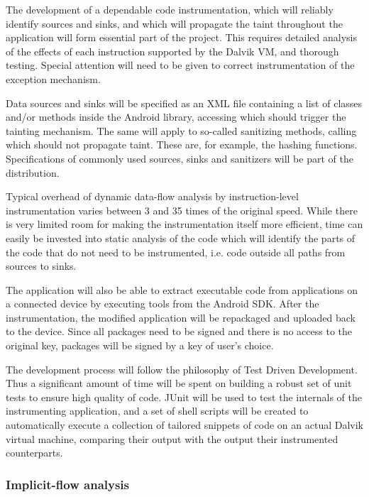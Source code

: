 \documentclass[12pt]{article}
\begin{document}

The development of a dependable code instrumentation, which will reliably 
identify sources and sinks, and which will propagate the taint throughout 
the application will form essential part of the project. This requires 
detailed analysis of the effects of each instruction supported by the 
Dalvik VM, and thorough testing. Special attention will need to be given 
to correct instrumentation of the exception mechanism.

Data sources and sinks will be specified as an XML file containing a list
of classes and/or methods inside the Android library, accessing which
should trigger the tainting mechanism. The same will apply to so-called 
sanitizing methods, calling which should not propagate taint. These
are, for example, the hashing functions. Specifications of commonly used 
sources, sinks and sanitizers will be part of the distribution.

Typical overhead of dynamic data-flow analysis by instruction-level 
instrumentation varies between 3 and 35 times of the original speed. While 
there is very limited room for making the instrumentation itself more 
efficient, time can easily be invested into static analysis of the code which 
will identify the parts of the code that do not need to be instrumented, 
i.e. code outside all paths from sources to sinks. 

The application will also be able to extract executable code from 
applications on a connected device by executing tools from the Android SDK.
After the instrumentation, the modified application will be repackaged and
uploaded back to the device. Since all packages need to be signed and there
is no access to the original key, packages will be signed by a key of user's
choice.

The development process will follow the philosophy of Test Driven 
Development. Thus a significant amount of time will be spent on building 
a robust set of unit tests to ensure high quality of code. JUnit will be 
used to test the internals of the instrumenting application, and a set of 
shell scripts will be created to automatically execute a collection
of tailored snippets of code on an actual Dalvik virtual machine, 
comparing their output with the output their instrumented counterparts.

\subsubsection*{Implicit-flow analysis}
\end{document}
